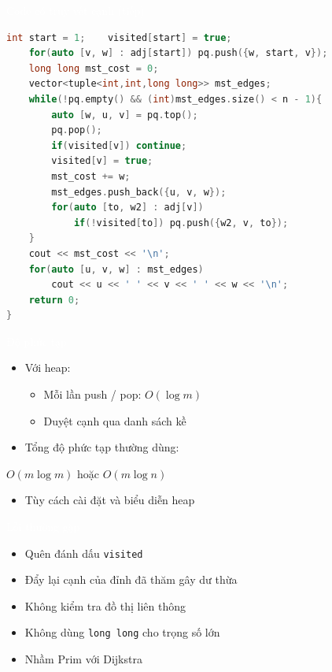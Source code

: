 \documentclass{beamer}
\newcommand{\hlred}[1]{\textcolor{myred}{#1}}
\newcommand{\hlwhite}[1]{\textcolor{white}{#1}}
\begin{document}
\begin{frame}[fragile]{\hlwhite{Code có truy vết cạnh (tiếp)}}
\begin{lstlisting}[language=C++]
    int start = 1;    visited[start] = true;
    for(auto [v, w] : adj[start]) pq.push({w, start, v});
    long long mst_cost = 0;
    vector<tuple<int,int,long long>> mst_edges;
    while(!pq.empty() && (int)mst_edges.size() < n - 1){
        auto [w, u, v] = pq.top();
        pq.pop();
        if(visited[v]) continue;
        visited[v] = true;
        mst_cost += w;
        mst_edges.push_back({u, v, w});
        for(auto [to, w2] : adj[v])
            if(!visited[to]) pq.push({w2, v, to});
    }
    cout << mst_cost << '\n';
    for(auto [u, v, w] : mst_edges)
        cout << u << ' ' << v << ' ' << w << '\n';
    return 0;
}
\end{lstlisting}
\end{frame}


\begin{frame}{\hlwhite{Độ phức tạp}}
\begin{itemize}
\item Với heap:
\begin{itemize}
\item Mỗi lần push / pop: $O(\log m)$
\item Duyệt cạnh qua danh sách kề
\end{itemize}
\item Tổng độ phức tạp thường dùng:
\end{itemize}

\begin{tcolorbox}
\centering
\hlred{$O(m \log m)$} hoặc \hlred{$O(m \log n)$}
\end{tcolorbox}

\begin{itemize}
\item Tùy cách cài đặt và biểu diễn heap
\end{itemize}
\end{frame}


\begin{frame}{\hlwhite{Lỗi thường gặp}}
\begin{itemize}
\item Quên đánh dấu \texttt{visited}
\item Đẩy lại cạnh của đỉnh đã thăm gây dư thừa
\item Không kiểm tra đồ thị liên thông
\item Không dùng \texttt{long long} cho trọng số lớn
\item Nhầm Prim với Dijkstra
\end{itemize}
\end{frame}
\end{document}
